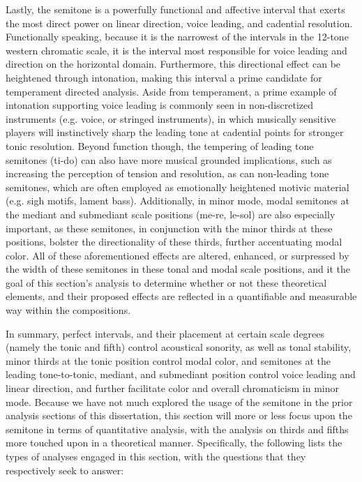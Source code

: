 Lastly, the semitone is a powerfully functional and affective interval
that exerts the most direct power on linear direction, voice leading,
and cadential resolution. Functionally speaking, because it is the
narrowest of the intervals in the 12-tone western chromatic scale, it is
the interval most responsible for voice leading and direction on the
horizontal domain. Furthermore, this directional effect can be
heightened through intonation, making this interval a prime candidate
for temperament directed analysis. Aside from temperament, a prime
example of intonation supporting voice leading is commonly seen in
non-discretized instruments (e.g. voice, or stringed instruments), in
which musically sensitive players will instinctively sharp the leading
tone at cadential points for stronger tonic resolution. Beyond function
though, the tempering of leading tone semitones (ti-do) can also have
more musical grounded implications, such as increasing the perception of
tension and resolution, as can non-leading tone semitones, which are
often employed as emotionally heightened motivic material (e.g. sigh
motifs, lament bass). Additionally, in minor mode, modal semitones at
the mediant and submediant scale positions (me-re, le-sol) are also
especially important, as these semitones, in conjunction with the minor
thirds at these positions, bolster the directionality of these thirds,
further accentuating modal color. All of these aforementioned effects
are altered, enhanced, or surpressed by the width of these semitones in
these tonal and modal scale positions, and it the goal of this section's
analysis to determine whether or not these theoretical elements, and
their proposed effects are reflected in a quantifiable and measurable
way within the compositions.

In summary, perfect intervals, and their placement at certain scale
degrees (namely the tonic and fifth) control acoustical sonority, as
well as tonal stability, minor thirds at the tonic position control
modal color, and semitones at the leading tone-to-tonic, mediant, and
submediant position control voice leading and linear direction, and
further facilitate color and overall chromaticism in minor mode. Because
we have not much explored the usage of the semitone in the prior
analysis sections of this dissertation, this section will more or less
focus upon the semitone in terms of quantitative analysis, with the
analysis on thirds and fifths more touched upon in a theoretical manner.
Specifically, the following lists the types of analyses engaged in this
section, with the questions that they respectively seek to answer:


